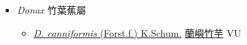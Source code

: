 
  \begin{itemize}
 \item[] \textit{Donax} 竹葉蕉屬
                    
  \begin{itemize}
        \item[] \href{http://www.theplantlist.org/tpl1.1/search?q=Donax+canniformis}{\textit{D. canniformis} (Forst.f.) K.Schum.}   \href{\detokenize{http://taibnet.sinica.edu.tw/chi/taibnet_species_list.php?T2=蘭嶼竹芋&T2_new_value=true&fr=y}}{蘭嶼竹芋} VU
  \end{itemize}
  \end{itemize}
